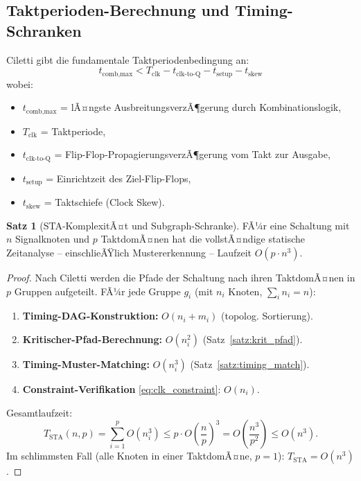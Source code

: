 ﻿\documentclass[a4paper,12pt]{article}
\theoremstyle{definition}
\newtheorem{satz}{Satz}
\begin{document}
\subsection{Taktperioden-Berechnung und Timing-Schranken}

Ciletti \cite[S.~801--803]{ciletti2011} gibt die fundamentale Taktperiodenbedingung an:
\begin{equation}\label{eq:clk_constraint}
  t_{\text{comb,max}} < T_{\text{clk}} - t_{\text{clk-to-Q}} - t_{\text{setup}} - t_{\text{skew}}
\end{equation}
wobei:
\begin{itemize}
  \item $t_{\text{comb,max}}$ = lÃ¤ngste AusbreitungsverzÃ¶gerung durch Kombinationslogik,
  \item $T_{\text{clk}}$ = Taktperiode,
  \item $t_{\text{clk-to-Q}}$ = Flip-Flop-PropagierungsverzÃ¶gerung vom Takt zur Ausgabe,
  \item $t_{\text{setup}}$ = Einrichtzeit des Ziel-Flip-Flops,
  \item $t_{\text{skew}}$ = Taktschiefe (Clock Skew).
\end{itemize}

\begin{satz}[STA-KomplexitÃ¤t und Subgraph-Schranke]\label{satz:sta_complexity}
  FÃ¼r eine Schaltung mit $n$ Signalknoten und $p$ TaktdomÃ¤nen hat die vollstÃ¤ndige
  statische Zeitanalyse -- einschlieÃŸlich Mustererkennung -- Laufzeit $O(p \cdot n^3)$.
\end{satz}

\begin{proof}
  Nach Ciletti \cite[S.~800]{ciletti2011} werden die Pfade der Schaltung nach ihren
  TaktdomÃ¤nen in $p$ Gruppen aufgeteilt. FÃ¼r jede Gruppe $g_i$ (mit $n_i$ Knoten,
  $\sum_i n_i = n$):

  \begin{enumerate}
    \item \textbf{Timing-DAG-Konstruktion:} $O(n_i + m_i)$ (topolog. Sortierung).
    \item \textbf{Kritischer-Pfad-Berechnung:} $O(n_i^2)$ (Satz~\ref{satz:krit_pfad}).
    \item \textbf{Timing-Muster-Matching:} $O(n_i^3)$ (Satz~\ref{satz:timing_match}).
    \item \textbf{Constraint-Verifikation} \eqref{eq:clk_constraint}: $O(n_i)$.
  \end{enumerate}

  Gesamtlaufzeit:
  \[
    T_{\text{STA}}(n,p) = \sum_{i=1}^{p} O(n_i^3) \leq p \cdot O\!\left(\frac{n}{p}\right)^3
    = O\!\left(\frac{n^3}{p^2}\right) \leq O(n^3).
  \]
  Im schlimmsten Fall (alle Knoten in einer TaktdomÃ¤ne, $p=1$): $T_{\text{STA}} = O(n^3)$.
\end{proof}
\end{document}
